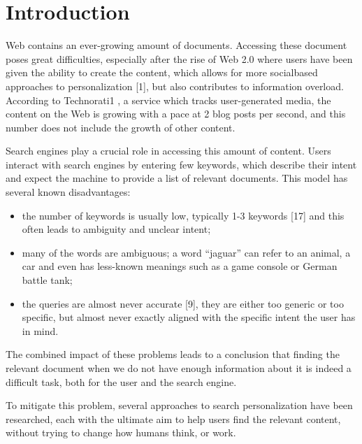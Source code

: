 \documentclass{acm_proc_article-sp} %
\begin{document}




\section{Introduction}

Web contains an ever-growing amount of documents. Accessing
these document poses great difficulties, especially
after the rise of Web 2.0 where users have been given the
ability to create the content, which allows for more socialbased
approaches to personalization [1], but also contributes
to information overload. According to Technorati1
, a service
which tracks user-generated media, the content on the Web
is growing with a pace at 2 blog posts per second, and this
number does not include the growth of other content.

Search engines play a crucial role in accessing this amount
of content. Users interact with search engines by entering
few keywords, which describe their intent and expect the
machine to provide a list of relevant documents. This model
has several known disadvantages:

\begin{itemize}  
	\item the number of keywords is usually low, typically 1-3
	keywords [17] and this often leads to ambiguity and
	unclear intent;
	\item many of the words are ambiguous; a word “jaguar”
	can refer to an animal, a car and even has less-known
	meanings such as a game console or German battle
	tank;
	\item the queries are almost never accurate [9], they are either
	too generic or too specific, but almost never exactly
	aligned with the specific intent the user has in
	mind.
\end{itemize}

The combined impact of these problems leads to a conclusion
that finding the relevant document when we do not have
enough information about it is indeed a difficult task, both
for the user and the search engine.

To mitigate this problem, several approaches to search personalization
have been researched, each with the ultimate
aim to help users find the relevant content, without trying
to change how humans think, or work.
\end{document}
